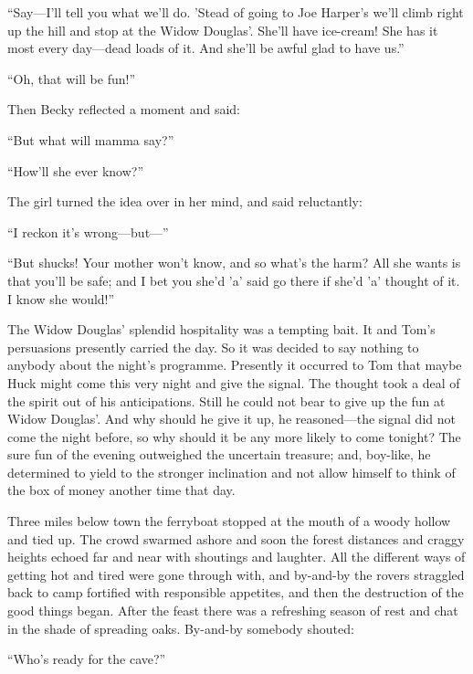 \documentclass{book}
\begin{document}
“Say—I’ll tell you what we’ll do. ’Stead of going to Joe Harper’s we’ll climb right up the hill and stop at the Widow Douglas’. She’ll have ice-cream! She has it most every day—dead loads of it. And she’ll be awful glad to have us.”

“Oh, that will be fun!”

Then Becky reflected a moment and said:

“But what will mamma say?”

“How’ll she ever know?”

The girl turned the idea over in her mind, and said reluctantly:

“I reckon it’s wrong—but—”

“But shucks! Your mother won’t know, and so what’s the harm? All she wants is that you’ll be safe; and I bet you she’d ’a’ said go there if she’d ’a’ thought of it. I know she would!”

The Widow Douglas’ splendid hospitality was a tempting bait. It and Tom’s persuasions presently carried the day. So it was decided to say nothing to anybody about the night’s programme. Presently it occurred to Tom that maybe Huck might come this very night and give the signal. The thought took a deal of the spirit out of his anticipations. Still he could not bear to give up the fun at Widow Douglas’. And why should he give it up, he reasoned—the signal did not come the night before, so why should it be any more likely to come tonight? The sure fun of the evening outweighed the uncertain treasure; and, boy-like, he determined to yield to the stronger inclination and not allow himself to think of the box of money another time that day.

Three miles below town the ferryboat stopped at the mouth of a woody hollow and tied up. The crowd swarmed ashore and soon the forest distances and craggy heights echoed far and near with shoutings and laughter. All the different ways of getting hot and tired were gone through with, and by-and-by the rovers straggled back to camp fortified with responsible appetites, and then the destruction of the good things began. After the feast there was a refreshing season of rest and chat in the shade of spreading oaks. By-and-by somebody shouted:

“Who’s ready for the cave?”
\end{document}
